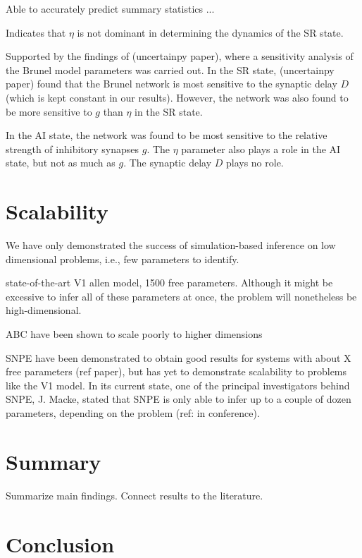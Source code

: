 Able to accurately predict summary statistics ...

Indicates that $\eta$ is not dominant in determining the dynamics of the SR state. 

Supported by the findings of (uncertainpy paper), where a sensitivity analysis of the Brunel model parameters was carried out. In the SR state, (uncertainpy paper) found that the Brunel network is most sensitive to the synaptic delay $D$ (which is kept constant in our results). However, the network was also found to be more sensitive to $g$ than $\eta$ in the SR state. 

In the AI state, the network was found to be most sensitive to the relative strength of inhibitory synapses $g$. The $\eta$ parameter also plays a role in the AI state, but not as much as $g$. The synaptic delay $D$ plays no role. 

\section{Scalability}

We have only demonstrated the success of simulation-based inference on low dimensional problems, i.e., few parameters to identify. 

state-of-the-art V1 allen model, 1500 free parameters. Although it might be excessive to infer all of these parameters at once, the problem will nonetheless be high-dimensional. 

ABC have been shown to scale poorly to higher dimensions

SNPE have been demonstrated to obtain good results for systems with about X free parameters (ref paper), but has yet to demonstrate scalability to problems like the V1 model. In its current state, one of the principal investigators behind SNPE, J. Macke, stated that SNPE is only able to infer up to a couple of dozen parameters, depending on the problem (ref: in conference).


\section{Summary}\label{sec:summary}

Summarize main findings. Connect results to the literature. 

\section{Conclusion}\label{sec:conclusion}

